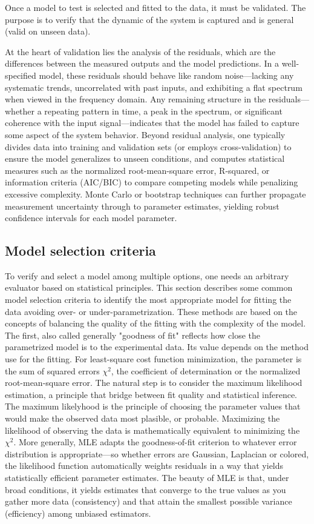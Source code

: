 Once a model to test is selected and fitted to the data, it must be validated. The purpose is to verify that the dynamic of the system is captured and is general (valid on unseen data). 

At the heart of validation lies the analysis of the residuals, which are the differences between the measured outputs and the model predictions. In a well-specified model, these residuals should behave like random noise—lacking any systematic trends, uncorrelated with past inputs, and exhibiting a flat spectrum when viewed in the frequency domain. Any remaining structure in the residuals—whether a repeating pattern in time, a peak in the spectrum, or significant coherence with the input signal—indicates that the model has failed to capture some aspect of the system behavior. Beyond residual analysis, one typically divides data into training and validation sets (or employs cross-validation) to ensure the model generalizes to unseen conditions, and computes statistical measures such as the normalized root-mean-square error, R-squared, or information criteria (AIC/BIC) to compare competing models while penalizing excessive complexity. Monte Carlo or bootstrap techniques can further propagate measurement uncertainty through to parameter estimates, yielding robust confidence intervals for each model parameter.

\subsection{Model selection criteria}

To verify and select a model among multiple options, one needs an arbitrary evaluator based on statistical principles. This section describes some common model selection criteria to identify the most appropriate model for fitting the data avoiding over- or under-parametrization. These methods are based on the concepts of balancing the quality of the fitting with the complexity of the model. The first, also called generally "goodness of fit" reflects how close the parametrized model is to the experimental  data. Its value depends on the method use for the fitting. For least-square cost function minimization, the parameter is the sum of squared errors $\chi ^2$, the coefficient of determination or the normalized root-mean-square error. The natural step is to consider the maximum likelihood estimation, a principle that bridge between fit quality and statistical inference. The maximum likelyhood is the principle of choosing the parameter values that would make the observed data most plasible, or probable. Maximizing the likelihood of observing the data is mathematically equivalent to minimizing the $\chi ^2$. More generally, MLE adapts the goodness-of-fit criterion to whatever error distribution is appropriate—so whether errors are Gaussian, Laplacian or colored, the likelihood function automatically weights residuals in a way that yields statistically efficient parameter estimates. The beauty of MLE is that, under broad conditions, it yields estimates that converge to the true values as you gather more data (consistency) and that attain the smallest possible variance (efficiency) among unbiased estimators.

